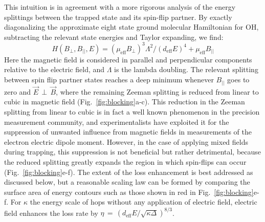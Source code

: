 \documentclass[%
 reprint,
 amsmath,amssymb,
 aps,
prl,
]{revtex4-1}
\newcommand{\epb}{{$\vec{E}\,{\perp}\,\vec{B}$}}
\begin{document}
This intuition is in agreement with a more rigorous analysis of the energy splittings between the trapped state and its spin-flip partner. 
By exactly diagonalizing the approximate eight state ground molecular Hamiltonian for OH, subtracting the relevant state energies and Taylor expanding, we find:
\begin{equation}
H(B_\perp,B_{||},E) = (\mu_\text{eff}B_\perp)^3\Lambda^2/(d_\text{eff}E)^4 + \mu_\text{eff}B_{||}
\end{equation}
Here the magnetic field is considered in parallel and perpendicular components relative to the electric field, and $\Lambda$ is the lambda doubling.
The relevant splitting between spin flip partner states reaches a deep minimum whenever $B_{||}$ goes to zero and \epb, where the remaining Zeeman splitting is reduced from linear to cubic in magnetic field (Fig.~\ref{fig:blocking}a-c).
This reduction in the Zeeman splitting from linear to cubic is in fact a well known phenomenon in the precision measurement community, and experimentalists have exploited it for the suppression of unwanted influence from magnetic fields in measurements of the electron electric dipole moment.
However, in the case of applying mixed fields during trapping, this suppression is not beneficial but rather detrimental, because the reduced splitting greatly expands the region in which spin-flips can occur (Fig.~\ref{fig:blocking}e-f).
The extent of the loss enhancement is best addressed as discussed below, but a reasonable scaling law can be formed by comparing the surface area of energy contours such as those shown in red in Fig.~\ref{fig:blocking}e-f.
For $\kappa$ the energy scale of hops without any application of electric field, electric field enhances the loss rate by $\eta \,{=}\, (d_\text{eff}E/\sqrt{\kappa\Delta})^{8/3}$.
\end{document}
